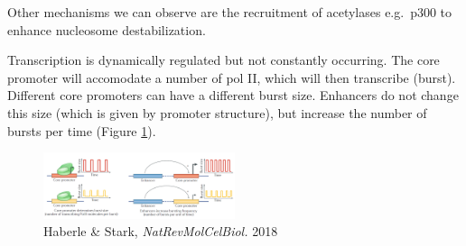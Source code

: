 Other mechanisms we can observe are the recruitment of acetylases e.g.~p300 to enhance nucleosome destabilization.

Transcription is dynamically regulated but not constantly occurring. The core promoter will accomodate a number of pol II, which will then transcribe (burst). Different core promoters can have a different burst size. Enhancers do not change this size (which is given by promoter structure), but increase the number of bursts per time (Figure \ref{fig:burst}).

\begin{figure}
\centering
\includegraphics[width=0.5\textwidth]{../_resources/Screenshot_2022-10-10_at_10-50-43.png}
\caption{Haberle \& Stark, \emph{NatRevMolCelBiol.} 2018}
\label{fig:burst}
\end{figure}


